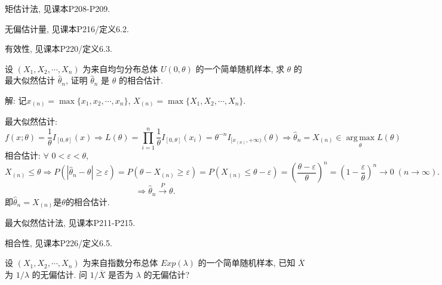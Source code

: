 \documentclass[standard]{ExBook}
\renewenvironment{shaded}{%
  \def\FrameCommand{\fboxsep=\FrameSep \colorbox{shadecolor}}%
  \MakeFramed{\advance\hsize-\width \FrameRestore}%
}{%
  \endMakeFramed
}
\begin{document}
\begin{qitems}
\textcolor{themeColor}{\selectfont {} 矩估计法, 见课本P208-P209.}

\textcolor{themeColor}{\selectfont {} 无偏估计量, 见课本P216/定义6.2.}

\textcolor{themeColor}{\selectfont {} 有效性, 见课本P220/定义6.3.}

\vspace{2.5cm-5em}

    \begin{bbox}
    \begin{shaded}
        \qitem
设 \((X_1, X_2, \cdots, X_n)\) 为来自均匀分布总体 \(U(0, \theta)\) 的一个简单随机样本, 求 \(\theta\) 的最大似然估计 \(\hat{\theta}_n\), 证明 \(\hat{\theta}_n\) 是 \(\theta\) 的相合估计.
    \end{shaded}
    \end{bbox}

\vspace{\dimexpr2.5cm-5em\relax}

解: 记$x_{(n)}=\max\{x_1,x_2,\cdots,x_n\}$, $X_{(n)}=\max\{X_1,X_2,\cdots,X_n\}$.

最大似然估计:
$$
f(x;\theta)=\frac{1}{\theta}I_{[0,\theta]}(x)
\Longrightarrow
L(\theta)
=\prod_{i=1}^{n}\frac{1}{\theta}I_{[0,\theta]}(x_i)
=\theta^{-n}I_{[x_{(n)},+\infty)}(\theta)
\Longrightarrow
\hat{\theta}_{n}
=X_{(n)}
\in
\operatorname*{arg\,max}_{\theta}L(\theta)
$$
相合估计: $\forall$ $0<\varepsilon<\theta$,
$$
X_{(n)} \leq \theta
\Longrightarrow
P(|\hat{\theta}_{n}-\theta|\geq\varepsilon)
=
P(\theta-X_{(n)}\geq\varepsilon)
=
P(X_{(n)}\leq\theta-\varepsilon)
=
\left(\frac{\theta-\varepsilon}{\theta}\right)^n
=
\left(1-\frac{\varepsilon}{\theta}\right)^n
\to 0\;(n\to \infty).
$$
$$
\Longrightarrow
\hat{\theta}_{n}\xrightarrow{P}\theta.
$$
即$\hat{\theta}_{n}=X_{(n)}$是$\theta$的相合估计.

\textcolor{themeColor}{\selectfont {} 最大似然估计法, 见课本P211-P215.}

\textcolor{themeColor}{\selectfont {} 相合性, 见课本P226/定义6.5.}

\vspace{2.5cm-5em}

    \begin{bbox}
    \begin{shaded}
        \qitem
设 \((X_1, X_2, \cdots, X_n)\) 为来自指数分布总体 \(Exp(\lambda)\) 的一个简单随机样本, 已知 \(\overline{X}\) 为 \(1 \big/ \lambda\) 的无偏估计. 问 \(1 / \overline{X}\) 是否为 \(\lambda\) 的无偏估计?
    \end{shaded}
    \end{bbox}


\end{qitems}
\end{document}
